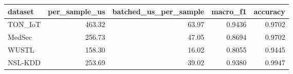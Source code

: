 \begin{tabular}{lrrrr}
\toprule
dataset & per\_sample\_us & batched\_us\_per\_sample & macro\_f1 & accuracy \\
\midrule
TON\_IoT & 463.32 & 63.97 & 0.9436 & 0.9702 \\
MedSec & 256.73 & 47.05 & 0.8694 & 0.9702 \\
WUSTL & 158.30 & 16.02 & 0.8055 & 0.9445 \\
NSL-KDD & 253.69 & 39.02 & 0.9380 & 0.9947 \\
\bottomrule
\end{tabular}
